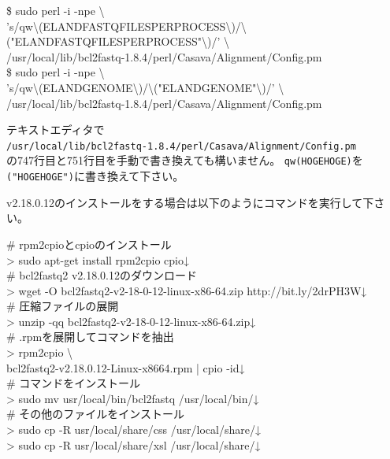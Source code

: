 \documentclass[titlepage,10pt,a4paper]{jsbook}
\newenvironment{cmd}{\begin{oframed}\raggedright\ttfamily\footnotesize\setlength{\baselineskip}{1.4em}}{\end{oframed}\vspace{-1em}}
\begin{document}
\begin{cmd}
\$ sudo perl -i -npe {\textbackslash}\\
's/qw{\textbackslash}(ELAND{\textunderscore}FASTQ{\textunderscore}FILES{\textunderscore}PER{\textunderscore}PROCESS{\textbackslash})/{\textbackslash}("ELAND{\textunderscore}FASTQ{\textunderscore}FILES{\textunderscore}PER{\textunderscore}PROCESS"{\textbackslash})/' {\textbackslash}\\
/usr/local/lib/bcl2fastq-1.8.4/perl/Casava/Alignment/Config.pm\\
\$ sudo perl -i -npe {\textbackslash}\\
's/qw{\textbackslash}(ELAND{\textunderscore}GENOME{\textbackslash})/{\textbackslash}("ELAND{\textunderscore}GENOME"{\textbackslash})/' {\textbackslash}\\
/usr/local/lib/bcl2fastq-1.8.4/perl/Casava/Alignment/Config.pm
\end{cmd}

テキストエディタで\\
\texttt{/usr/local/lib/bcl2fastq-1.8.4/perl/Casava/Alignment/Config.pm}\\
の747行目と751行目を手動で書き換えても構いません。
\texttt{qw(HOGEHOGE)}を\texttt{("HOGEHOGE")}に書き換えて下さい。

v2.18.0.12のインストールをする場合は以下のようにコマンドを実行して下さい。

\begin{cmd}
\# rpm2cpioとcpioのインストール\\
{\textgreater} sudo apt-get install rpm2cpio cpio↓\\
\# bcl2fastq2 v2.18.0.12のダウンロード\\
{\textgreater} wget -O bcl2fastq2-v2-18-0-12-linux-x86-64.zip http://bit.ly/2drPH3W↓\\
\# 圧縮ファイルの展開\\
{\textgreater} unzip -qq bcl2fastq2-v2-18-0-12-linux-x86-64.zip↓\\
\# .rpmを展開してコマンドを抽出\\
{\textgreater} rpm2cpio {\textbackslash}\\
bcl2fastq2-v2.18.0.12-Linux-x86{\textunderscore}64.rpm | cpio -id↓\\
\# コマンドをインストール\\
{\textgreater} sudo mv usr/local/bin/bcl2fastq /usr/local/bin/↓\\
\# その他のファイルをインストール\\
{\textgreater} sudo cp -R usr/local/share/css /usr/local/share/↓\\
{\textgreater} sudo cp -R usr/local/share/xsl /usr/local/share/↓
\end{cmd}
\end{document}
